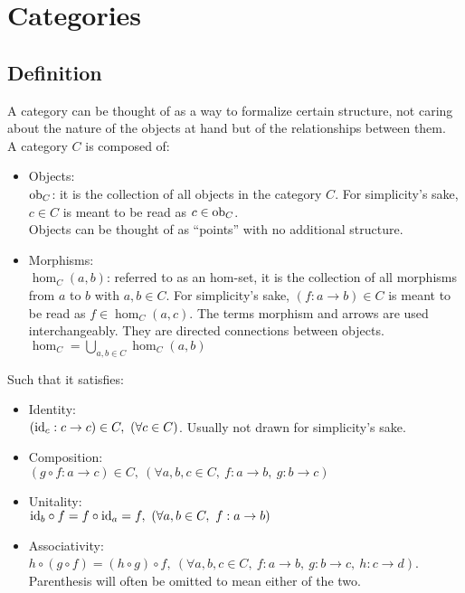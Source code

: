 \section{Categories}

\subsection{Definition}
A category can be thought of as a way to formalize certain structure, not caring
about the nature of the objects at hand but of the relationships between them.\\
A category $C$ is composed of: \parencite{fong_spivak:7sketches}
\begin{itemize}
  \item Objects:\\
    $\mathrm{ob}_C$: it is the collection of all objects in the category $C$.
    For simplicity's sake, $c\in C$ is meant to be read as $c\in
    \mathrm{ob}_C$.\\
    Objects can be thought of as ``points'' with no additional structure.
  \item Morphisms:\\
    $\hom_C(a, b)$: referred to as an hom-set, it is the collection of
    all morphisms from $a$ to $b$ with $a,b\in C$. For simplicity's sake, $(f: a
    \to b) \in C$ is meant to be read as $f \in \hom_C(a,c)$. The terms
    morphism and arrows are used interchangeably. They are directed connections
    between objects.\\
    $\hom_C = \bigcup\limits_{a,b\in C} \hom_C(a,b)$
\end{itemize}

Such that it satisfies:
\begin{itemize}
  \item Identity:\\
    $(\mathrm{id}_c: c \to c) \in C,\ (\forall c \in C)$. Usually not drawn for
    simplicity's sake.
  \item Composition:\\
    $(g \circ f : a \to c) \in C,
      \ (\forall a, b, c \in C,\ f: a \to b,\ g:b \to c)$
  \item Unitality:\\
    $\mathrm{id}_b \circ f = f \circ \mathrm{id}_a = f,
      \ (\forall a, b \in C,\ f: a \to b)$
  \item Associativity:\\
    $h \circ (g \circ f) = (h \circ g) \circ f, \ (\forall a,b,c\in C,\ f:a\to
      b,\ g:b\to c,\ h:c\to d)$. Parenthesis will often be omitted to mean
      either of the two.
\end{itemize}

